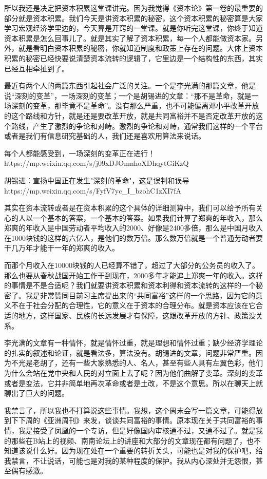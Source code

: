 \documentclass[UTF8, 12pt, a4paper]{ctexrep}
\begin{document}
所以我还是决定把资本积累这堂课讲完。因为我觉得《资本论》第一卷的最重要的部分就是资本积累。我们今天是讲资本积累的秘密，这个资本积累的秘密算是大家学习宏观经济学里边的，今天算是开窍的一堂课。就是你听完这堂课，你终于知道资本积累是怎么回事儿了。就是其实了解了资本积累，每一个人都能做资本家。另外，就是看明白资本积累的秘密，你就知道制度和政策上存在的问题。大体上资本积累的秘密已经快要说清楚资本流转的逻辑了，它里边是一个结构性的东西，其实已经互相牵扯到了。

最近有两个人的两篇东西引起社会广泛的关注。一个是李光满的那篇文章，他是说“深刻的变革”，一场深刻的变革；一个是胡锡进的文章：“那不是革命，就是一场深刻的变革，那毕竟不是革命”。没有那么严重，也不可能偏离邓小平改革开放的这个路线和方针，就是还是要改革开放，就是共同富裕并不是否定改革开放的这个路线，产生了激烈的争论和对峙。激烈的争论和对峙，通常我们这样的一个平台或者是我们有信息研究基础的人，我们还是喜欢用算法来说话。

每个人都能感受到，一场深刻的变革正在进行！ https://mp.weixin.qq.com/s/j09xDJOnmhoXDhqytGiKzQ

胡锡进：宣扬中国正在发生"深刻的革命"，这是误判和误导 https://mp.weixin.qq.com/s/FyfV7yc\_I\_bzohC1zXI7fA

其实在资本流转或者是在资本积累的这个具体的详细测算中，我们可以给予所有关心的人以一个基本的答案，一个基本的答案。如果我们计算了郑爽的年收入，那么郑爽的年收入是中国劳动者平均收入的2000、好像是2400多倍，那么是中国月收入在1000块钱的这样的六亿人，是他们的数万倍。那么数万倍就是一个普通劳动者要干几万年才能干一年的郑爽的收入。

而那个月收入在10000块钱的人已经算不错了，超过了大部分的公务员的收入了。那么也要从春秋战国开始工作干到现在，2000多年才能追上郑爽一年的收入。这样的事情是不是合适呢？我们就要讲资本积累和资本利得和资本流转的这样的一个秘密了。我是非常赞同目前习主席提出来的“共同富裕”这样的一个思路，因为它的意义不在于社会分配的合理性，它的意义在于资本的合理分布。就是资本应该在它合适的地方，这样国家、民族的长远发展才有保障，这跟改革开放的方针、政策没关系。

李光满的文章有一种情怀，就是情怀过重，就是理想和情怀过重；缺少经济学理论的扎实的叙述和论证，就是看法多，算法没有。胡锡进的文章，问题非常严重。因为不光是老胡了，还有一些大家熟悉的人、名人，甚至有些人具有左翼色彩，他们为什么会站在党中央和人民的对立面上去了呢？因为他们曲解了变革。深刻的变革或者是变法，它并非简单地再次革命或者是土改，不是这个意思。所以在聊天上就聊出了巨大的问题。

我禁言了，所以我也不打算说这些事情。我想，这个周末会写一篇文章，可能得放到下下周的《亚洲周刊》来发，谈谈共同富裕的事情。原本现在关于共同富裕的事情，我是接受了凤凰的一个专访，但是好像国内审核通不过，又通不过了。就是我的那些在B站上的视频、南南论坛上的讲座和大部分的文章现在都有问题了，也不知道该说什么好。因为现在处在一个重要的转折关头，可能也是对我的保护吧，给我禁言，不让说话，可能也是对我的某种程度的保护。我从内心深处并无怨恨，甚至偶有感激。
\end{document}
